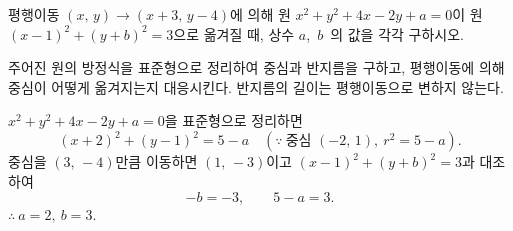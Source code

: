 \documentclass[10pt]{article}
\begin{document}
\newpage


\begin{dmproblem}
평행이동 $(x,\, y) \to (x + 3,\, y - 4)$에 의해 원 $x^2 + y^2 + 4x - 2y + a = 0$이 원 $(x - 1)^2 + (y + b)^2 = 3$으로 옮겨질 때, 상수 $a$,\ $b$\ 의 값을 각각 구하시오.
\end{dmproblem}

\begin{dmapproach}
주어진 원의 방정식을 표준형으로 정리하여 중심과 반지름을 구하고, 평행이동에 의해 중심이 어떻게 옮겨지는지 대응시킨다. 반지름의 길이는 평행이동으로 변하지 않는다.
\end{dmapproach}

\begin{dmsolution}
$x^2 + y^2 + 4x - 2y + a = 0$을 표준형으로 정리하면
\begin{equation*}
  (x + 2)^2 + (y - 1)^2 = 5 - a\quad(\because\ \text{중심 } (-2,\, 1),\ r^2 = 5 - a).
\end{equation*}
중심을 $(3,\, -4)$만큼 이동하면 $(1,\, -3)$이고 $(x - 1)^2 + (y + b)^2 = 3$과 대조하여
\begin{equation*}
  -b = -3,\qquad 5 - a = 3.
\end{equation*}
$\therefore\ a = 2,\ b = 3$.
\end{dmsolution}

\dmchecktitle



\newpage

\dmconcepthead
{}
\end{document}
